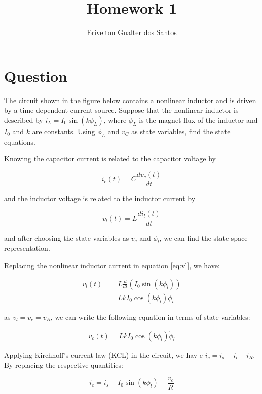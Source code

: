 \documentclass[a4paper,10pt]{article}
\title{Homework 1}
\author{Erivelton Gualter dos Santos}
\begin{document}
\date{}
\maketitle

\section{Question}

The circuit shown in the figure below contains a nonlinear inductor and is driven by a time-dependent current source. Suppose that the nonlinear inductor is described by $i_L =I_0\sin(k\phi_L)$, where $\phi_L$ is the magnet flux of the inductor and $I_0$ and $k$ are constants. Using $\phi_L$ and $v_C$ as state variables, find the state equations.

\hfill \break

Knowing the capacitor current is related to the capacitor voltage by 

\begin{equation}
 i_c(t) = C\frac{dv_c(t)}{dt} \label{eq:ic}
\end{equation}

and the inductor voltage is related to the inductor current by 

\begin{equation}
 v_l(t) = L\frac{di_l(t)}{dt} \label{eq:vl}
\end{equation}

and after choosing the state variables as $v_c$ and $\phi_l$, we can find the state space representation. 

Replacing the nonlinear inductor current in equation \ref{eq:vl}, we have:

\begin{eqnarray*}
 v_l(t) &= L\frac{d}{dt}(I_0\sin(k\phi_l))  \\
 &= LkI_0\cos(k\phi_l)\dot{\phi}_l
\end{eqnarray*}

as $v_l=v_c=v_R$, we can write the following equation in terms of state variables:

\begin{eqnarray}
 v_c(t) = LkI_0\cos(k\phi_l)\dot{\phi}_l \label{eq:dphi}
\end{eqnarray}

Applying Kirchhoff's current law (KCL) in the circuit, we hav e $i_c = i_s-i_l-i_R$. By replacing the respective quantities:

\begin{equation}
 i_c = i_s - I_0\sin(k\phi_l) - \frac{v_c}{R} \label{eq:ic2}
\end{equation}
\end{document}
